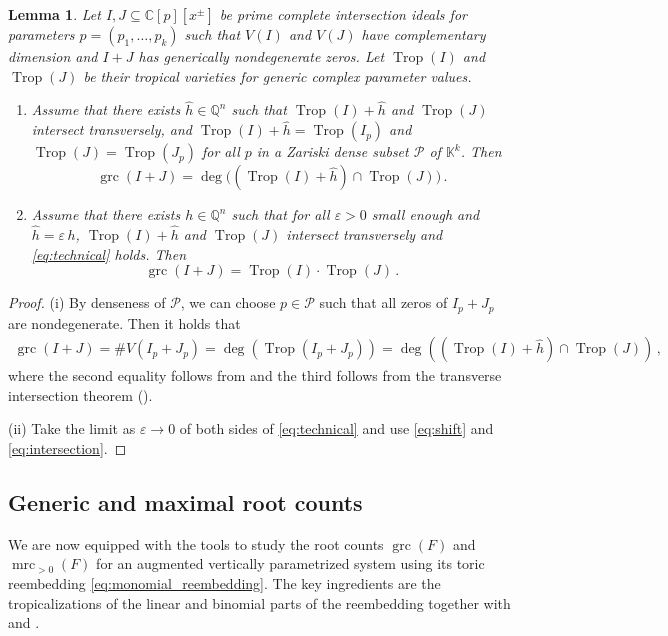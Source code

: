 \documentclass[11pt,reqno,a4paper]{amsart}
\numberwithin{equation}{section}
\theoremstyle{theoremstyle}
\newtheorem{lemma}[theorem]{Lemma}
\theoremstyle{examplestyle}
\newcommand{\CC}{\mathbb{C}}
\newcommand{\QQ}{\mathbb{Q}}
\DeclareMathOperator{\grc}{grc}
\DeclareMathOperator{\mrc}{mrc}
\DeclareMathOperator{\Trop}{Trop}
\begin{document}
\begin{lemma}\label{lem:technical}
Let $I,J\subseteq \CC[p][x^\pm]$ be prime  complete intersection ideals for parameters $p=(p_1,\dots,p_k)$ 
such that $V(I)$ and $V(J)$ have complementary dimension and $I+J$ has generically nondegenerate zeros. Let $\Trop(I)$ and $\Trop(J)$ be their tropical varieties for generic complex parameter values. 
\begin{enumerate}[label=(\roman*)]
    \item Assume that there exists $\hat{h}\in \QQ^n$ such that $\Trop(I)+\hat{h}$ and $\Trop(J)$ intersect transversely,  and $\Trop(I)+\hat{h}=\Trop(I_p)$ and $\Trop(J)=\Trop(J_p)$ for all $p$ in a  Zariski dense subset $\mathcal{P}$ of $\mathbb{K}^k$.
Then
\begin{equation}\label{eq:technical}
\grc(I+J)= \deg\big((\Trop(I)+\hat{h}) \cap \Trop(J)\big) \, .
\end{equation}
\item Assume that there exists $h\in \QQ^n$ such that for all $\varepsilon>0$ small enough and
$\hat{h} = \varepsilon \, h$,  
$\Trop(I)+\hat{h}$ and $\Trop(J)$ intersect transversely and \eqref{eq:technical} holds. Then
\[ \grc(I+J) = \Trop(I) \cdot \Trop(J)\, . \]
\end{enumerate}
\end{lemma}
\begin{proof}
(i) By denseness of $\mathcal{P}$, we can choose $p\in \mathcal{P}$ such that all zeros of $I_p+J_p$ are nondegenerate. Then it holds that
\begin{align*}
\grc(I+J)=\#V(I_p+J_p)=\deg(\Trop(I_p+J_p))=\deg((\Trop(I)+\hat{h})\cap \Trop(J))\,,
\end{align*}
where the
second equality follows from  and the third follows from the transverse intersection theorem ().

(ii) Take the limit as $\varepsilon\rightarrow 0$ of both sides of \eqref{eq:technical} and use \eqref{eq:shift} and \eqref{eq:intersection}.
\end{proof}


\subsection{Generic and maximal root counts}
\label{subsec:root_bounds}
We are now equipped with the tools  to 
study the root counts $\grc(F)$ and $\mrc_{>0}(F)$ for an augmented vertically parametrized system using its toric reembedding  \eqref{eq:monomial_reembedding}.
The key ingredients are the tropicalizations of the linear and binomial parts of the reembedding together with  and . 
\end{document}

